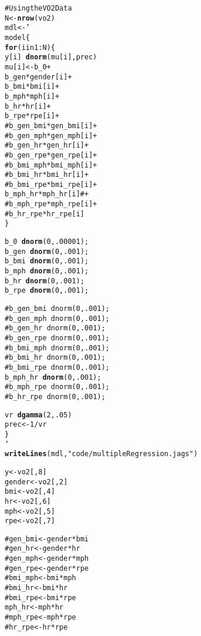 \documentclass[12pt,letterpaper,oneside]{article}\usepackage{graphicx, color}
\makeatletter
\newcommand{\hlfunctioncall}[1]{\textcolor[rgb]{0.501960784313725,0,0.329411764705882}{\textbf{#1}}}%
\newcommand{\hlstring}[1]{\textcolor[rgb]{0.6,0.6,1}{#1}}%
\newcommand{\hlcomment}[1]{\textcolor[rgb]{0.180392156862745,0.6,0.341176470588235}{#1}}%
\newenvironment{kframe}{%
 \def\at@end@of@kframe{}%
 \ifinner\ifhmode%
  \def\at@end@of@kframe{\end{minipage}}%
  \begin{minipage}{\columnwidth}%
 \fi\fi%
 \def\FrameCommand##1{\hskip\@totalleftmargin \hskip-\fboxsep
 \colorbox{shadecolor}{##1}\hskip-\fboxsep
     \hskip-\linewidth \hskip-\@totalleftmargin \hskip\columnwidth}%
 \MakeFramed {\advance\hsize-\width
   \@totalleftmargin\z@ \linewidth\hsize
   \@setminipage}}%
 {\par\unskip\endMakeFramed%
 \at@end@of@kframe}
\newenvironment{knitrout}{}{} %
\newcommand{\dateTaken}{January 7, 2013}
\makeatother
\begin{document}
\renewcommand{\dateTaken}{January 31, 2013}
\daysep
\begin{knitrout}\scriptsize
{}\color{fgcolor}\begin{kframe}
\begin{alltt}
\hlcomment{# Using the VO2 Data}
N <- \hlfunctioncall{nrow}(vo2)
mdl <- '
model \{
    \hlfunctioncall{for}( i in 1:N)\{
        y[i] ~ \hlfunctioncall{dnorm}(mu[i], prec)
        mu[i] <- b_0 +
                 b_gen*gender[i] +
                 b_bmi*bmi[i] +
                 b_mph*mph[i] +
                 b_hr*hr[i] +
                 b_rpe*rpe[i] +
\hlcomment{                 # b_gen_bmi*gen_bmi[i] +}
\hlcomment{                 # b_gen_mph*gen_mph[i] +}
\hlcomment{                 # b_gen_hr*gen_hr[i] +}
\hlcomment{                 # b_gen_rpe*gen_rpe[i] +}
\hlcomment{                 # b_bmi_mph*bmi_mph[i] +}
\hlcomment{                 # b_bmi_hr*bmi_hr[i] +}
\hlcomment{                 # b_bmi_rpe*bmi_rpe[i] +}
                 b_mph_hr*mph_hr[i] \hlcomment{# +}
\hlcomment{                 # b_mph_rpe*mph_rpe[i] +}
\hlcomment{                 # b_hr_rpe*hr_rpe[i]}
    \}

    b_0   ~ \hlfunctioncall{dnorm}(0, .00001);
    b_gen ~ \hlfunctioncall{dnorm}(0, .001);
    b_bmi ~ \hlfunctioncall{dnorm}(0, .001);
    b_mph ~ \hlfunctioncall{dnorm}(0, .001);
    b_hr  ~ \hlfunctioncall{dnorm}(0, .001);
    b_rpe ~ \hlfunctioncall{dnorm}(0, .001);

\hlcomment{    # b_gen_bmi ~ dnorm(0, .001);}
\hlcomment{    # b_gen_mph ~ dnorm(0, .001);}
\hlcomment{    # b_gen_hr  ~ dnorm(0, .001);}
\hlcomment{    # b_gen_rpe ~ dnorm(0, .001);}
\hlcomment{    # b_bmi_mph ~ dnorm(0, .001);}
\hlcomment{    # b_bmi_hr  ~ dnorm(0, .001);}
\hlcomment{    # b_bmi_rpe ~ dnorm(0, .001);}
    b_mph_hr  ~ \hlfunctioncall{dnorm}(0, .001);
\hlcomment{    # b_mph_rpe ~ dnorm(0, .001);}
\hlcomment{    # b_hr_rpe  ~ dnorm(0, .001);}

    vr ~ \hlfunctioncall{dgamma}(2, .05)
    prec <- 1/vr
\}
'
\hlfunctioncall{writeLines}(mdl, \hlstring{"code/multipleRegression.jags"})

y <- vo2[,8]
gender <- vo2[,2]
bmi <- vo2[,4]
hr <- vo2[,6]
mph <- vo2[,5]
rpe <- vo2[,7]

\hlcomment{# gen_bmi <- gender*bmi}
\hlcomment{# gen_hr <- gender*hr}
\hlcomment{# gen_mph <- gender*mph}
\hlcomment{# gen_rpe <- gender*rpe}
\hlcomment{# bmi_mph <- bmi*mph}
\hlcomment{# bmi_hr <- bmi*hr}
\hlcomment{# bmi_rpe <- bmi*rpe}
mph_hr <- mph*hr
\hlcomment{# mph_rpe <- mph*rpe}
\hlcomment{# hr_rpe <- hr*rpe}


\end{alltt}
\end{kframe}
\end{knitrout}
\end{document}
